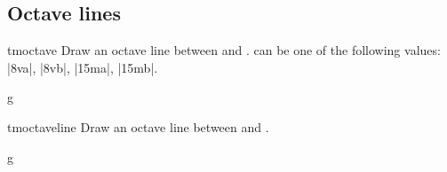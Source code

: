 \documentclass[11pt,a4paper]{ltxdoc}
\begin{document}
\subsection{Octave lines}\label{sec:line:octave}
\begin{docCommand}{tmoctave}{}
  Draw an octave line between  and .  can 
  be one of the following values: |8va|, |8vb|, |15ma|, |15mb|.
\end{docCommand}
\begin{dispExample}
\begin{tmsinglestaff}
  \begin{tmstaff}{g}
      
      
      
  \end{tmstaff}
\end{tmsinglestaff}
\end{dispExample}
\begin{docCommand}{tmoctaveline}{}
  Draw an octave line between  and .
\end{docCommand}
\begin{dispExample}
\begin{tmsinglestaff}
  \begin{tmstaff}{g}
  \end{tmstaff}
\end{tmsinglestaff}
\end{dispExample}
\end{document}
